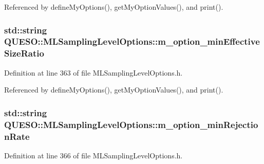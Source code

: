 Referenced by define\-My\-Options(), get\-My\-Option\-Values(), and print().

\hypertarget{class_q_u_e_s_o_1_1_m_l_sampling_level_options_a424cb93232913921ebde9cbca932a5c1}{
\subsubsection[{m\-\_\-option\-\_\-min\-Effective\-Size\-Ratio}]{\setlength{\rightskip}{0pt plus 5cm}std\-::string Q\-U\-E\-S\-O\-::\-M\-L\-Sampling\-Level\-Options\-::m\-\_\-option\-\_\-min\-Effective\-Size\-Ratio\hspace{0.3cm}{\ttfamily [private]}}}\label{class_q_u_e_s_o_1_1_m_l_sampling_level_options_a424cb93232913921ebde9cbca932a5c1}


Definition at line 363 of file M\-L\-Sampling\-Level\-Options.\-h.



Referenced by define\-My\-Options(), get\-My\-Option\-Values(), and print().

\hypertarget{class_q_u_e_s_o_1_1_m_l_sampling_level_options_a384a262aeb20ef3ff57e9dd4697b464e}{
\subsubsection[{m\-\_\-option\-\_\-min\-Rejection\-Rate}]{\setlength{\rightskip}{0pt plus 5cm}std\-::string Q\-U\-E\-S\-O\-::\-M\-L\-Sampling\-Level\-Options\-::m\-\_\-option\-\_\-min\-Rejection\-Rate\hspace{0.3cm}{\ttfamily [private]}}}\label{class_q_u_e_s_o_1_1_m_l_sampling_level_options_a384a262aeb20ef3ff57e9dd4697b464e}


Definition at line 366 of file M\-L\-Sampling\-Level\-Options.\-h.



